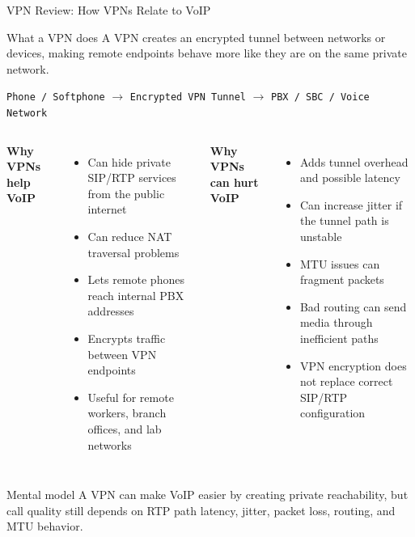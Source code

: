 \documentclass[aspectratio=169]{beamer}
\begin{document}
\begin{frame}{VPN Review: How VPNs Relate to VoIP}
\small

\begin{block}{What a VPN does}
A VPN creates an encrypted tunnel between networks or devices, making remote endpoints behave more like they are on the same private network.
\end{block}

\vspace{0.2cm}

\begin{center}
\texttt{Phone / Softphone}
\quad $\longrightarrow$ \quad
\texttt{Encrypted VPN Tunnel}
\quad $\longrightarrow$ \quad
\texttt{PBX / SBC / Voice Network}
\end{center}


\begin{columns}[T]

\textbf{Why VPNs help VoIP}

\begin{itemize}
    \item Can hide private SIP/RTP services from the public internet
    \item Can reduce NAT traversal problems
    \item Lets remote phones reach internal PBX addresses
    \item Encrypts traffic between VPN endpoints
    \item Useful for remote workers, branch offices, and lab networks
\end{itemize}


\textbf{Why VPNs can hurt VoIP}

\begin{itemize}
    \item Adds tunnel overhead and possible latency
    \item Can increase jitter if the tunnel path is unstable
    \item MTU issues can fragment packets
    \item Bad routing can send media through inefficient paths
    \item VPN encryption does not replace correct SIP/RTP configuration
\end{itemize}

\end{columns}


\begin{alertblock}{Mental model}
A VPN can make VoIP easier by creating private reachability, but call quality still depends on RTP path latency, jitter, packet loss, routing, and MTU behavior.
\end{alertblock}

\end{frame}
\end{document}
